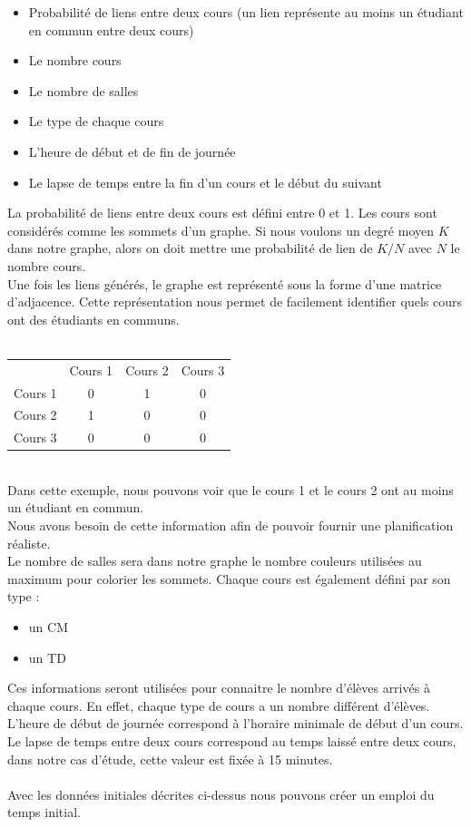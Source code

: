 \documentclass[a4paper,11pt]{article}
\begin{document}
	\begin{itemize}
		\item Probabilité de liens entre deux cours (un lien représente au moins un étudiant en commun entre deux cours)
		\item Le nombre cours
		\item Le nombre de salles 
		\item Le type de chaque cours 
		\item L'heure de début et de fin de journée
		\item Le lapse de temps entre la fin d'un cours et le début du suivant
	\end{itemize}

	La probabilité de liens entre deux cours est défini entre 0 et 1. Les cours sont considérés comme les sommets d'un graphe. Si nous voulons un degré moyen $K$ dans notre graphe, alors on doit mettre une probabilité de lien de $K/N$ avec $N$ le nombre cours.\\
	Une fois les liens générés, le graphe est représenté sous la forme d'une matrice d'adjacence. 
	Cette représentation nous permet de facilement identifier quels cours ont des étudiants en communs.\\
	\\
	\begin{tabular}{ | c | c | c | c |}
		\hline			
		\       & Cours 1 & Cours 2 & Cours 3\\
		Cours 1 &   0     &    1    &     0  \\
		Cours 2 &   1     &    0    &     0  \\
		Cours 3 &   0     &    0    &     0  \\
		\hline  
	\end{tabular}\\
	Dans cette exemple, nous pouvons voir que le cours 1 et le cours 2 ont au moins un étudiant en commun.\\
	Nous avons besoin de cette information afin de pouvoir fournir une planification réaliste.\\
	Le nombre de salles sera dans notre graphe le nombre couleurs utilisées au maximum pour colorier les sommets.
	Chaque cours est également défini par son type :
	\begin{itemize}
		\item un CM
		\item un TD
	\end{itemize}
	Ces informations seront utilisées pour connaitre le nombre d'élèves arrivés à chaque cours. En effet, chaque type de cours a un nombre différent d'élèves.\\
	L'heure de début de journée correspond à l'horaire minimale de début d'un cours.\\
	Le lapse de temps entre deux cours correspond au temps laissé entre deux cours, dans notre cas d'étude, cette valeur est fixée à 15 minutes.\\
	\\
	Avec les données initiales décrites ci-dessus nous pouvons créer un emploi du temps initial.
\newpage
\end{document}
